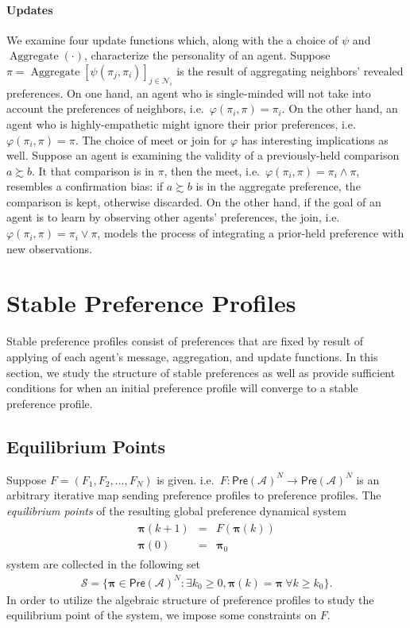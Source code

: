 \documentclass[conference]{ieeeconf}
\newcommand{\N}{\mathcal{N}}
\newcommand{\A}{\mathcal{A}}
\renewcommand{\S}{\mathcal{S}}
\newcommand{\Pref}{\mathsf{Pre}}
\newcommand{\prefers}{\succsim}
\newcommand{\profile}{\boldsymbol{\pi}}
\newcommand{\join}{\vee}
\newcommand{\meet}{\wedge}
\renewcommand{\geq}{\geqslant}
\DeclareMathOperator{\Aggregate}{Aggregate}
\begin{document}
\paragraph*{Updates}
We examine four update functions which, along with the a choice of $\psi$ and $\Aggregate(\cdot)$, characterize the personality of an agent. Suppose $\pi = \Aggregate\left[\psi(\pi_j,\pi_i)\right]_{j \in \N_i}$ is the result of aggregating neighbors' revealed preferences. On one hand, an agent who is single-minded will not take into account the preferences of neighbors, i.e.~$\varphi(\pi_i,\pi) = \pi_i$. On the other hand, an agent who is highly-empathetic might ignore their prior preferences, i.e.~$\varphi(\pi_i,\pi) = \pi$. The choice of meet or join for $\varphi$ has interesting implications as well. Suppose an agent is examining the validity of a previously-held comparison $a \prefers b$. It that comparison is in $\pi$, then the meet, i.e.~$\varphi(\pi_i,\pi) = \pi_i \meet \pi$, resembles a confirmation bias: if $a \prefers b$ is in the aggregate preference, the comparison is kept, otherwise discarded. On the other hand, if the goal of an agent is to learn by observing other agents' preferences, the join, i.e.~$\varphi(\pi_i,\pi) = \pi_i \join \pi$, models the process of integrating a prior-held preference with new observations.

\section{Stable Preference Profiles}
\label{sec:stable}

Stable preference profiles consist of preferences that are fixed by result of applying of each agent's message, aggregation, and update functions. In this section, we study the structure of stable preferences as well as provide sufficient conditions for when an initial preference profile will converge to a stable preference profile.

\subsection{Equilibrium Points}

Suppose $F = (F_1,F_2,\dots,F_N)$ is given. i.e.~$F: \Pref(\A)^N \to \Pref(\A)^N$ is an arbitrary iterative map sending preference profiles to preference profiles. The \emph{equilibrium points} of the resulting global preference dynamical system
\begin{align}
    \begin{aligned}
        \profile(k+1) &=& F\left( \profile(k) \right) \\
        \profile(0) &=& \profile_0
    \end{aligned} \label{eq:global-pi}
\end{align}
system are collected in the following set
\begin{align*}
    \S = \{\profile \in \Pref(\A)^N : \exists k_0 \geq 0, \profile(k) = \profile~\forall k \geq k_0\}.
\end{align*}
In order to utilize the algebraic structure of preference profiles to study the equilibrium point of the system, we impose some constraints on $F$. 
\end{document}
